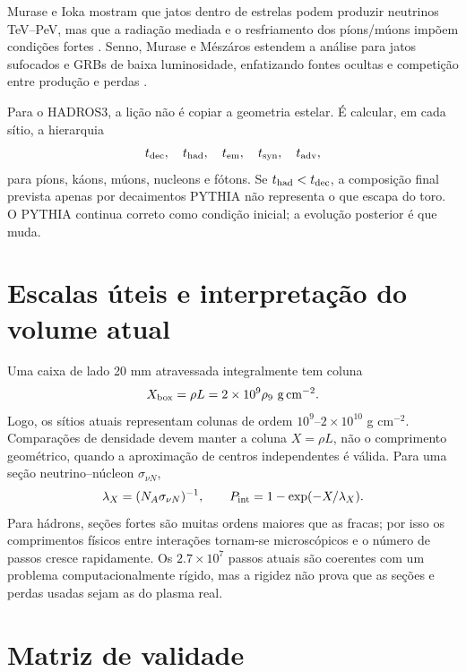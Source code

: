 \documentclass[11pt,a4paper]{article}
\newcommand{\rhoNine}{\rho_9}
\begin{document}
Murase e Ioka mostram que jatos dentro de estrelas podem produzir neutrinos
TeV--PeV, mas que a radiação mediada e o resfriamento dos píons/múons impõem
condições fortes \cite{MuraseIoka2013}. Senno, Murase e Mészáros estendem a
análise para jatos sufocados e GRBs de baixa luminosidade, enfatizando fontes
ocultas e competição entre produção e perdas \cite{Senno2016}.

Para o HADROS3, a lição não é copiar a geometria estelar. É calcular, em cada
sítio, a hierarquia
\begin{equation}
t_{\rm dec},\quad t_{\rm had},\quad t_{\rm em},\quad t_{\rm syn},\quad
t_{\rm adv},
\end{equation}
para píons, káons, múons, nucleons e fótons. Se $t_{\rm had}<t_{\rm dec}$, a
composição final prevista apenas por decaimentos PYTHIA não representa o que
escapa do toro. O PYTHIA continua correto como condição inicial; a evolução
posterior é que muda.

\section{Escalas úteis e interpretação do volume atual}

Uma caixa de lado 20 mm atravessada integralmente tem coluna
\begin{equation}
X_{\rm box}=\rho L=2\times10^9\rhoNine\ \mathrm{g\,cm^{-2}}.
\end{equation}
Logo, os sítios atuais representam colunas de ordem $10^9$--$2\times10^{10}$
g cm$^{-2}$. Comparações de densidade devem manter a coluna $X=\rho L$, não
o comprimento geométrico, quando a aproximação de centros independentes é
válida. Para uma seção neutrino--núcleon $\sigma_{\nu N}$,
\begin{equation}
\lambda_X=(N_A\sigma_{\nu N})^{-1},\qquad
P_{\rm int}=1-\exp(-X/\lambda_X).
\end{equation}
Para hádrons, seções fortes são muitas ordens maiores que as fracas; por isso
os comprimentos físicos entre interações tornam-se microscópicos e o número
de passos cresce rapidamente. Os $2.7\times10^7$ passos atuais são coerentes
com um problema computacionalmente rígido, mas a rigidez não prova que as
seções e perdas usadas sejam as do plasma real.

\section{Matriz de validade}
\end{document}
